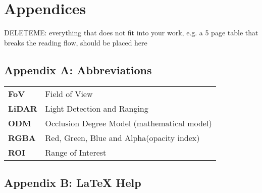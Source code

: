 \chapter*{Appendices}
\label{appendices}
DELETEME: everything that does not fit into your work, e.g. a 5 page table that breaks the reading flow, should be placed here

{}
\section*{Appendix A: Abbreviations}
\begin{center}
\begin{tabular}{ll}
\textbf{FoV}	&	Field of View\\
\textbf{LiDAR}	&	Light Detection and Ranging\\
\textbf{ODM}	&	Occlusion Degree Model (mathematical model)\\
\textbf{RGBA}	&	Red, Green, Blue and Alpha(opacity index)\\
\textbf{ROI}	&	Range of Interest\\
\end{tabular}
\end{center}

\newpage
\section*{Appendix B: {\LaTeX} Help}

